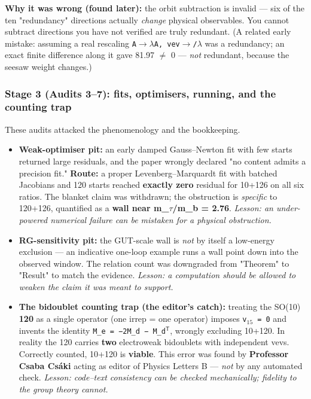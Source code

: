 \documentclass[11pt]{article}
\begin{document}
\textbf{Why it was wrong (found later):} the orbit subtraction is invalid --- six of the
ten "redundancy" directions actually \emph{change} physical observables. You cannot
subtract directions you have not verified are truly redundant. (A related early
mistake: assuming a real rescaling \texttt{A$\rightarrow$$\lambda$A, vev$\rightarrow$/$\lambda$} was a redundancy; an exact finite
difference along it gave 81.97 $\neq$ 0 --- \emph{not} redundant, because the seesaw weight
changes.)

\subsubsection*{Stage 3 (Audits 3--7): fits, optimisers, running, and the counting trap}

These audits attacked the phenomenology and the bookkeeping.

\begin{itemize}
\item \textbf{Weak-optimiser pit:} an early damped Gauss--Newton fit with few starts returned
  large residuals, and the paper wrongly declared "no content admits a precision
  fit." \textbf{Route:} a proper Levenberg--Marquardt fit with batched Jacobians and 120
  starts reached \textbf{exactly zero} residual for 10+126 on all six ratios. The blanket
  claim was withdrawn; the obstruction is \emph{specific} to 120+126, quantified as a
  \textbf{wall near m\_$\tau$/m\_b = 2.76}. \emph{Lesson: an under-powered numerical failure can be
  mistaken for a physical obstruction.}
\item \textbf{RG-sensitivity pit:} the GUT-scale wall is \emph{not} by itself a low-energy
  exclusion --- an indicative one-loop example runs a wall point down into the
  observed window. The relation count was downgraded from "Theorem" to "Result" to
  match the evidence. \emph{Lesson: a computation should be allowed to weaken the claim
  it was meant to support.}
\item \textbf{The bidoublet counting trap (the editor's catch):} treating the SO(10)
  \textbf{120} as a single operator (one irrep = one operator) imposes \texttt{v$_{15}$ = 0} and
  invents the identity \texttt{M\_e = −2M\_d − M\_d$^{\mathsf T}$}, wrongly excluding 10+120. In reality
  the 120 carries \textbf{two} electroweak bidoublets with independent vevs. Correctly
  counted, 10+120 is \textbf{viable}. This error was found by \textbf{Professor Csaba Cs\'aki}
  acting as editor of Physics Letters B --- \emph{not} by any automated check. \emph{Lesson:
  code--text consistency can be checked mechanically; fidelity to the group theory
  cannot.}
\end{itemize}
\end{document}
